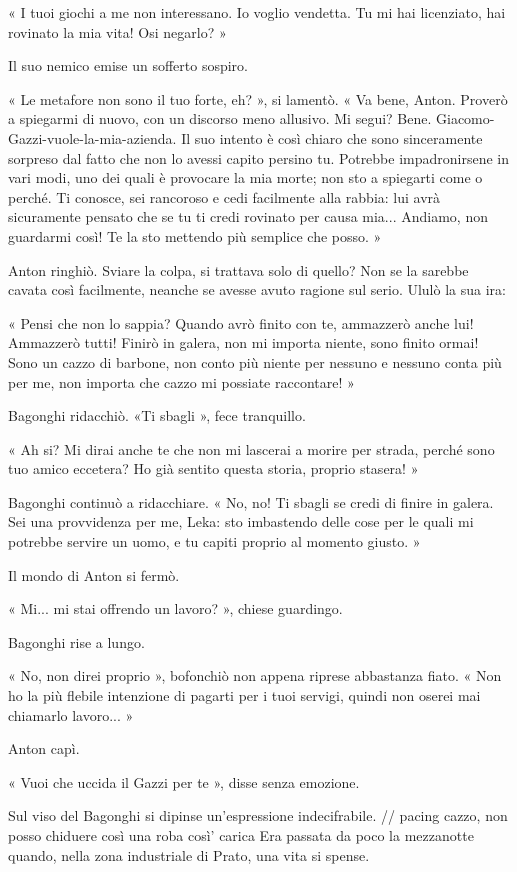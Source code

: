 « I tuoi giochi a me non interessano. Io voglio vendetta. Tu mi hai licenziato, hai rovinato la mia vita! Osi negarlo? »

Il suo nemico emise un sofferto sospiro.

« Le metafore non sono il tuo forte, eh? », si lamentò. « Va bene, Anton. Proverò a spiegarmi di nuovo, con un discorso meno allusivo. Mi segui? Bene. Giacomo-Gazzi-vuole-la-mia-azienda. Il suo intento è così chiaro che sono sinceramente sorpreso dal fatto che non lo avessi capito persino tu. Potrebbe impadronirsene in vari modi, uno dei quali è provocare la mia morte; non sto a spiegarti come o perché. Ti conosce, sei rancoroso e cedi facilmente alla rabbia: lui avrà sicuramente pensato che se tu ti credi rovinato per causa mia... Andiamo, non guardarmi così! Te la sto mettendo più semplice che posso. »

Anton ringhiò. Sviare la colpa, si trattava solo di quello? Non se la sarebbe cavata così facilmente, neanche se avesse avuto ragione sul serio. Ululò la sua ira:

« Pensi che non lo sappia? Quando avrò finito con te, ammazzerò anche lui! Ammazzerò tutti! Finirò in galera, non mi importa niente, sono finito ormai! Sono un cazzo di barbone, non conto più niente per nessuno e nessuno conta più per me, non importa che cazzo mi possiate raccontare! »

Bagonghi ridacchiò. «Ti sbagli », fece tranquillo.

« Ah si? Mi dirai anche te che non mi lascerai a morire per strada, perché sono tuo amico eccetera? Ho già sentito questa storia, proprio stasera! »

Bagonghi continuò a ridacchiare. « No, no! Ti sbagli se credi di finire in galera. Sei una provvidenza per me, Leka: sto imbastendo delle cose per le quali mi potrebbe servire un uomo, e tu capiti proprio al momento giusto. »

Il mondo di Anton si fermò.

« Mi... mi stai offrendo un lavoro? », chiese guardingo.

Bagonghi rise a lungo.

« No, non direi proprio », bofonchiò non appena riprese abbastanza fiato. « Non ho la più flebile intenzione di pagarti per i tuoi servigi, quindi non oserei mai chiamarlo lavoro... »

Anton capì.

« Vuoi che uccida il Gazzi per te », disse senza emozione.

Sul viso del Bagonghi si dipinse un'espressione indecifrabile.
// pacing cazzo, non posso chiduere così una roba così' carica
Era passata da poco la mezzanotte quando, nella zona industriale di Prato, una vita si spense.


